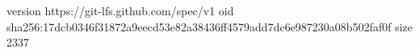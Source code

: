 version https://git-lfs.github.com/spec/v1
oid sha256:17dcb0346f31872a9eecd53e82a38436ff4579add7dc6e987230a08b502faf0f
size 2337
